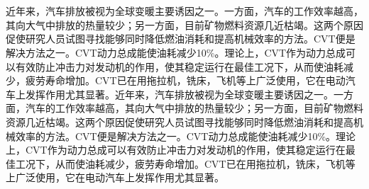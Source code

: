 \documentclass[a4paper,11pt]{article}
\newcommand{\wuhao}{\fontsize{10.5pt}{10.5pt}\selectfont} %
\begin{document}
\section{}
\song\wuhao 近年来，汽车排放被视为全球变暖主要诱因之一。一方面，汽车的工作效率越高，其向大气中排放的热量较少；另一方面，目前矿物燃料资源几近枯竭。这两个原因促使研究人员试图寻找能够同时降低燃油消耗和提高机械效率的方法。CVT便是解决方法之一。CVT动力总成能使油耗减少10\%。理论上，CVT作为动力总成可以有效防止冲击力对发动机的作用，使其稳定运行在最佳工况下，从而使油耗减少，疲劳寿命增加。CVT已在用拖拉机，铣床，飞机等上广泛使用，它在电动汽车上发挥作用尤其显著。近年来，汽车排放被视为全球变暖主要诱因之一。一方面，汽车的工作效率越高，其向大气中排放的热量较少；另一方面，目前矿物燃料资源几近枯竭。这两个原因促使研究人员试图寻找能够同时降低燃油消耗和提高机械效率的方法。CVT便是解决方法之一。CVT动力总成能使油耗减少10\%。理论上，CVT作为动力总成可以有效防止冲击力对发动机的作用，使其稳定运行在最佳工况下，从而使油耗减少，疲劳寿命增加。CVT已在用拖拉机，铣床，飞机等上广泛使用，它在电动汽车上发挥作用尤其显著。
\end{document}
